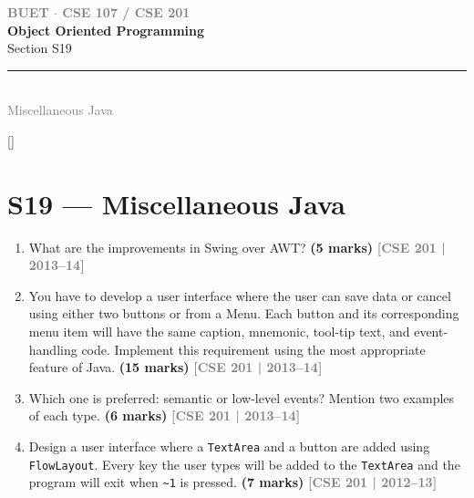 \documentclass[12pt,a3paper]{article}
\newcommand{\yr}[1]{\hfill\textcolor{gray}{\small\textbf{[#1]}}}
\newcommand{\mk}[1]{\textcolor{orange!70!black}{\small\textbf{(#1 marks)}}}
\newcommand{\secdivider}[4]{%
  \newpage\thispagestyle{empty}%
  \vspace*{\fill}%
  \begin{tcolorbox}[enhanced,colback=#4!7,colframe=#3,boxrule=1.5pt,arc=8pt,
    left=20pt,right=20pt,top=22pt,bottom=22pt,
    shadow={3pt}{-3pt}{0pt}{black!15}]
    \centering
    {\large\textcolor{gray}{\textbf{BUET $\cdot$ CSE 107 / CSE 201}}}\\[8pt]
    {\fontsize{26}{32}\selectfont\bfseries\textcolor{#3}{Object Oriented Programming}}\\[6pt]
    {\fontsize{15}{19}\selectfont\textcolor{dgray}{#1}}\\[12pt]
    \textcolor{#3!60}{\rule{0.5\textwidth}{0.5pt}}\\[6pt]
    {\small\textcolor{gray}{#2}}
  \end{tcolorbox}%
  \vspace*{\fill}\newpage%
}
\begin{document}
\newpage
\secdivider{Section S19}{Miscellaneous Java}{cC}{cC}
\label{sec:S19}
\titleformat{\section}{\large\bfseries\color{cC}}{}{0em}{}[\titlerule]
\section{S19 --- Miscellaneous Java}

\begin{enumerate}





\item What are the improvements in Swing over AWT? \mk{5}
\yr{CSE 201 | 2013--14}





\item You have to develop a user interface where the user can save data or cancel using either two buttons or from a Menu. Each button and its corresponding menu item will have the same caption, mnemonic, tool-tip text, and event-handling code. Implement this requirement using the most appropriate feature of Java. \mk{15}
\yr{CSE 201 | 2013--14}





\item Which one is preferred: semantic or low-level events? Mention two examples of each type. \mk{6}
\yr{CSE 201 | 2013--14}






\item Design a user interface where a \texttt{TextArea} and a button are added using \texttt{FlowLayout}. Every key the user types will be added to the \texttt{TextArea} and the program will exit when \texttt{\textasciitilde{}1} is pressed. \mk{7}
\yr{CSE 201 | 2012--13}


\end{enumerate}
\end{document}
